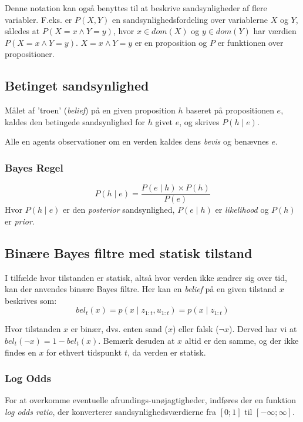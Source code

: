 Denne notation kan også benyttes til at beskrive sandsynligheder af flere variabler.
F.eks. er $P(X,Y)$ en sandsynlighedsfordeling over variablerne $ X $ og $ Y $, således at $P(X = x \wedge Y = y)$, hvor $x \in dom(X)$ og $y \in dom(Y)$ har værdien $P(X = x \wedge Y = y)$.
$X = x \wedge Y = y$ er en proposition og $ P $ er funktionen over propositioner. 

\subsection{Betinget sandsynlighed}

Målet af 'troen' (\textit{belief}) på en given proposition $ h $ baseret på propositionen $ e $, kaldes den betingede sandsynlighed for $ h $ givet $ e $, og skrives $P(h \mid e)$.

Alle en agents observationer om en verden kaldes dens \emph{bevis} og benævnes $ e $.


\subsubsection{Bayes Regel}

$$P(h \mid e) = \frac{P(e \mid h) \times P(h)}{P(e)}$$
Hvor $P(h \mid e)$ er den \emph{posterior} sandsynlighed, $P(e \mid h)$ er \emph{likelihood} og $P(h)$ er \emph{prior}. 


\subsection{Binære Bayes filtre med statisk tilstand}\label{bayes_binaerfiltre}
I tilfælde hvor tilstanden er statisk, altså hvor verden ikke ændrer sig over tid, kan der anvendes binære Bayes filtre.
Her kan en \textit{belief} på en given tilstand $x$ beskrives som:
\begin{equation}
bel_t(x) = p(x \mid z_{1:t},u_{1:t}) = p(x \mid z_{1:t})
\end{equation}

Hvor tilstanden $x$ er binær, dvs. enten sand ($x$) eller falsk ($\lnot x$).
Derved har vi at $bel_t(\lnot x) = 1 - bel_t(x)$.
Bemærk desuden at $x$ altid er den samme, og der ikke findes en $x$ for ethvert tidspunkt $t$, da verden er statisk.

\subsubsection{Log Odds}
For at overkomme eventuelle afrundings-unøjagtigheder, indføres der en funktion \textit{log odds ratio}, der konverterer sandsynlighedsværdierne fra $[0;1]$ til $[-\infty;\infty]$.

